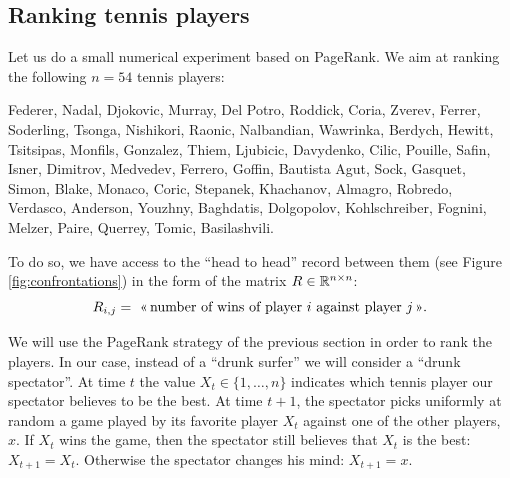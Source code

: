 \documentclass[11pt,nocut]{article}
\begin{document}
\subsection{Ranking tennis players}

Let us do a small numerical experiment based on PageRank.
We aim at ranking the following $n=54$ tennis players:
\begin{center}
Federer, Nadal, Djokovic, Murray, Del Potro, Roddick, Coria, Zverev, Ferrer, Soderling, Tsonga, Nishikori, Raonic, Nalbandian, Wawrinka, Berdych, Hewitt, Tsitsipas, Monfils, Gonzalez, Thiem, Ljubicic, Davydenko, Cilic, Pouille, Safin, Isner, Dimitrov, Medvedev, Ferrero, Goffin, Bautista Agut, Sock, Gasquet, Simon, Blake, Monaco, Coric, Stepanek, Khachanov, Almagro, Robredo, Verdasco, Anderson, Youzhny, Baghdatis, Dolgopolov, Kohlschreiber, Fognini, Melzer, Paire, Querrey, Tomic, Basilashvili.
\end{center}

To do so, we have access to the ``head to head'' record between them (see Figure \ref{fig:confrontations}) in the form of the matrix $R \in \mathbb{R}^{n \times n}$:
\begin{equation}\label{eq:def_R}
R_{i,j} = \ \text{<<\,number of wins of player $i$ against player $j$\,>>}.
\end{equation}

We will use the PageRank strategy of the previous section in order to rank the players. In our case, instead of a ``drunk surfer'' we will consider a ``drunk spectator''.
At time $t$ the value $X_t \in \{1, \dots, n\}$ indicates which tennis player our spectator believes to be the best. At time $t+1$, the spectator picks uniformly at random a game played by its favorite player $X_t$ against one of the other players, $x$.
If $X_t$ wins the game, then the spectator still believes that $X_t$ is the best: $X_{t+1} = X_t$. Otherwise the spectator changes his mind: $X_{t+1} = x$.
\end{document}
